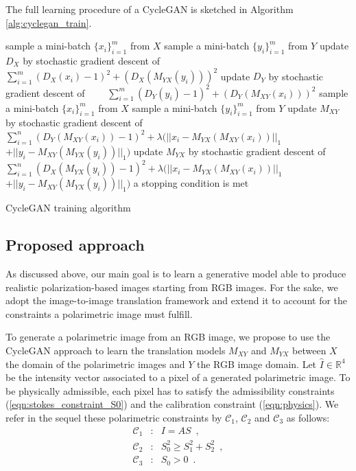 The full learning procedure of a CycleGAN  is sketched in Algorithm \ref{alg:cyclegan_train}.

\begin{algorithm}[]
	\begin{algorithmic}[H]
		\REPEAT
		\STATE sample a mini-batch $\lbrace x_i \rbrace_{i=1}^m$ from $X$\;
		\STATE sample a mini-batch $\lbrace y_i \rbrace_{i=1}^m$ from $Y$\;
		\STATE update $D_X$ by stochastic gradient descent of
		\STATE \ \ \ \ $ \sum_{i=1}^{m}(D_X(x_i)-1)^2 + (D_X(M_{YX}(y_i)))^2$
		\STATE update $D_Y$ by stochastic gradient descent of
		\STATE \ \ \ \ $ \sum_{i=1}^{m}(D_Y(y_i)-1)^2 + (D_Y(M_{XY}(x_i)))^2$
		\STATE sample a mini-batch $\lbrace x_i \rbrace_{i=1}^m$ from $X$\;
		\STATE sample a mini-batch $\lbrace y_i \rbrace_{i=1}^m$ from $Y$\;
		\STATE update $M_{XY}$ by stochastic gradient descent of
		\STATE \ \ \ \ $ \sum_{i=1}^n (D_Y(M_{XY}(x_i))-1)^2 + \lambda (||x_i - M_{YX}(M_{XY}(x_i))||_1$ \STATE \ \ \ \ \ \ \ \ $+||y_i -M_{XY}(M_{YX}(y_i))||_1)$\;
		\STATE update $M_{YX}$ by stochastic gradient descent of
		\STATE \ \ \ \ $ \sum_{i=1}^n (D_X(M_{YX}(y_i))-1)^2+ \lambda (||x_i - M_{YX}(M_{XY}(x_i))||_1 $
		\STATE \ \ \ \ \ \ \ \ $+ ||y_i - M_{XY}(M_{YX}(y_i))||_1)$\;
		\UNTIL a stopping condition is met
	\end{algorithmic}
	\caption{CycleGAN training algorithm}
	\label{alg:cyclegan_train}
\end{algorithm}

\subsection{Proposed approach}
\label{polarGAN}

As discussed above, our main goal is to learn a generative model able to produce realistic polarization-based images starting from RGB images. For the sake, we adopt the image-to-image translation framework and extend it to account for the constraints a polarimetric image must fulfill. 

To generate a polarimetric image  from an RGB image, we propose to use the CycleGAN approach to learn the translation models $M_{XY}$ and $M_{YX}$ between $X$ the domain of the polarimetric images and $Y$ the RGB image domain. Let $\hat{I} \in \mathbb{R}^4$ be the intensity vector associated to a pixel of a generated polarimetric image. To be physically admissible, each pixel  has to satisfy the admissibility constraints (\ref{eqn:stokes_constraint_S0}) and the calibration constraint (\ref{eqn:physics}). 
%
We refer in the sequel these polarimetric constraints by $\mathcal{C}_1$, $\mathcal{C}_2$ and $\mathcal{C}_3$ as follows:
\begin{eqnarray}
\mathcal{C}_1 &:& I = AS\enspace, \nonumber\\
\mathcal{C}_2 &:& S_0^2 \geqslant S_1^2 + S_2^2 \enspace, \nonumber\\
\mathcal{C}_3 &:& S_0 > 0 \enspace. \nonumber
\end{eqnarray}

